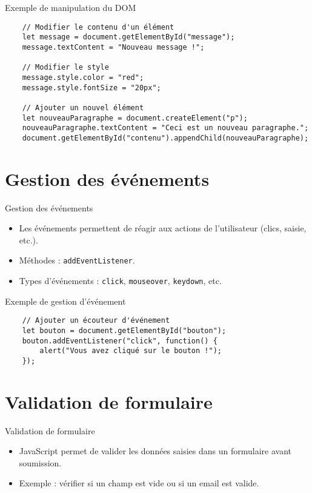 \documentclass{beamer}
\begin{document}
    \begin{frame}[fragile]{Exemple de manipulation du DOM}
    \begin{verbatim}
    // Modifier le contenu d'un élément
    let message = document.getElementById("message");
    message.textContent = "Nouveau message !";
    
    // Modifier le style
    message.style.color = "red";
    message.style.fontSize = "20px";
    
    // Ajouter un nouvel élément
    let nouveauParagraphe = document.createElement("p");
    nouveauParagraphe.textContent = "Ceci est un nouveau paragraphe.";
    document.getElementById("contenu").appendChild(nouveauParagraphe);
    \end{verbatim}
    \end{frame}
    
    \section{Gestion des événements}
    \begin{frame}{Gestion des événements}
    \begin{itemize}
        \item Les événements permettent de réagir aux actions de l'utilisateur (clics, saisie, etc.).
        \item Méthodes : \texttt{addEventListener}.
        \item Types d'événements : \texttt{click}, \texttt{mouseover}, \texttt{keydown}, etc.
    \end{itemize}
    \end{frame}
    
    \begin{frame}[fragile]{Exemple de gestion d'événement}
    \begin{verbatim}
    // Ajouter un écouteur d'événement
    let bouton = document.getElementById("bouton");
    bouton.addEventListener("click", function() {
        alert("Vous avez cliqué sur le bouton !");
    });
    \end{verbatim}
    \end{frame}
    
    \section{Validation de formulaire}
    \begin{frame}{Validation de formulaire}
    \begin{itemize}
        \item JavaScript permet de valider les données saisies dans un formulaire avant soumission.
        \item Exemple : vérifier si un champ est vide ou si un email est valide.
    \end{itemize}
    \end{frame}
    
\end{document}
